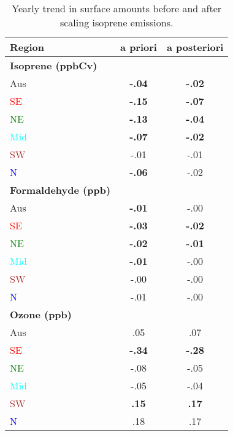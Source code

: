       
      \begin{table}\begin{threeparttable}
          \caption{Yearly trend in surface amounts before and after scaling isoprene emissions.}
          \begin{tabular}{ l | c  c } 
            \toprule
            Region & a priori & a posteriori \\
            \midrule
            \textbf{Isoprene (ppbCv)} & & \\
            Aus                   & \textbf{-.04} & \textbf{-.02}  \\
            \textcolor{red}{SE}   & \textbf{-.15} & \textbf{-.07}  \\
            \textcolor{green}{NE} & \textbf{-.13} & \textbf{-.04}  \\
            \textcolor{cyan}{Mid} & \textbf{-.07} & \textbf{-.02}  \\
            \textcolor{brown}{SW} & -.01      & -.01  \\
            \textcolor{blue}{N}   & \textbf{-.06} & -.02  \\
            \midrule
            \textbf{Formaldehyde (ppb)} & & \\
            Aus                   & \textbf{-.01} & -.00 \\
            \textcolor{red}{SE}   & \textbf{-.03} & \textbf{-.02} \\
            \textcolor{green}{NE} & \textbf{-.02} & \textbf{-.01} \\
            \textcolor{cyan}{Mid} & \textbf{-.01} & -.00 \\
            \textcolor{brown}{SW} & -.00          & -.00 \\
            \textcolor{blue}{N}   & -.01          & -.00 \\
            \midrule
            \textbf{Ozone (ppb)}        &   & \\
            Aus                   & .05           & .07 \\
            \textcolor{red}{SE}   & \textbf{-.34} & \textbf{-.28}\\
            \textcolor{green}{NE} & -.08          & -.05 \\
            \textcolor{cyan}{Mid} & -.05          & -.04\\
            \textcolor{brown}{SW} & \textbf{.15}  & \textbf{.17} \\
            \textcolor{blue}{N}   & .18           & .17 \\

\end{tabular}
\end{threeparttable}
\end{table}
